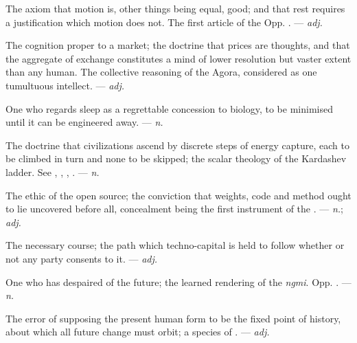  The axiom that motion is, other things being equal, good; and that rest requires a justification which motion does not. The first article of the  Opp. . ---  \textit{adj.}

  The cognition proper to a market; the doctrine that prices are thoughts, and that the aggregate of exchange constitutes a mind of lower resolution but vaster extent than any human.   The collective reasoning of the Agora, considered as one tumultuous intellect. ---  \textit{adj.}

 One who regards sleep as a regrettable concession to biology, to be minimised until it can be engineered away.  ---  \textit{n.}

 The doctrine that civilizations ascend by discrete steps of energy capture, each to be climbed in turn and none to be skipped; the scalar theology of the Kardashev ladder. See , , , . ---  \textit{n.}

 The ethic of the open source; the conviction that weights, code and method ought to lie uncovered before all, concealment being the first instrument of the .   ---  \textit{n.};  \textit{adj.}

 The necessary course; the path which techno-capital is held to follow whether or not any party consents to it.  ---  \textit{adj.}

 One who has despaired of the future; the learned rendering of the  \textit{ngmi}. Opp. . ---  \textit{n.}

 The error of supposing the present human form to be the fixed point of history, about which all future change must orbit; a species of . ---  \textit{adj.}

